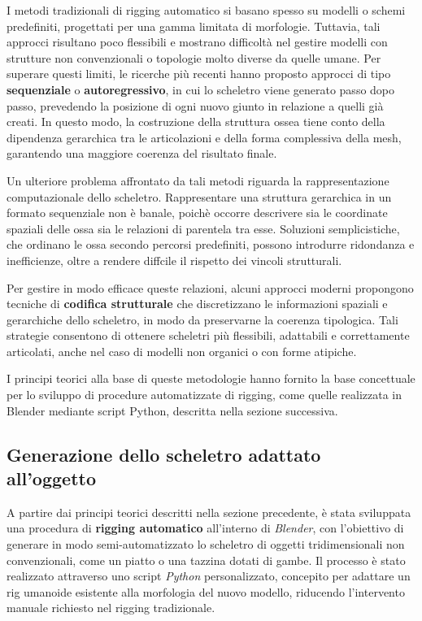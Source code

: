 I metodi tradizionali di rigging automatico si basano spesso su modelli o schemi predefiniti, progettati per una gamma limitata di morfologie. Tuttavia, tali approcci risultano poco flessibili e mostrano difficoltà nel gestire modelli con strutture non convenzionali o topologie molto diverse da quelle umane. Per superare questi limiti, le ricerche più recenti hanno proposto approcci di tipo \textbf{sequenziale} o \textbf{autoregressivo}, in cui lo scheletro viene generato passo dopo passo, prevedendo la posizione di ogni nuovo giunto in relazione a quelli già creati. In questo modo, la costruzione della struttura ossea tiene conto della dipendenza gerarchica tra le articolazioni e della forma complessiva della mesh, garantendo una maggiore coerenza del risultato finale.

Un ulteriore problema affrontato da tali metodi riguarda la rappresentazione computazionale dello scheletro. Rappresentare una struttura gerarchica in un formato sequenziale non è banale, poichè occorre descrivere sia le coordinate spaziali delle ossa sia le relazioni di parentela tra esse. Soluzioni semplicistiche, che ordinano le ossa secondo percorsi predefiniti, possono introdurre ridondanza e inefficienze, oltre a rendere diffcile il rispetto dei vincoli strutturali.

Per gestire in modo efficace queste relazioni, alcuni approcci moderni propongono tecniche di \textbf{codifica strutturale} che discretizzano le informazioni spaziali e gerarchiche dello scheletro, in modo da preservarne la coerenza tipologica. Tali strategie consentono di ottenere scheletri più flessibili, adattabili e correttamente articolati, anche nel caso di modelli non organici o con forme atipiche.

I principi teorici alla base di queste metodologie hanno fornito la base concettuale per lo sviluppo di procedure automatizzate di rigging, come quelle realizzata in Blender mediante script Python, descritta nella sezione successiva.


\subsection{Generazione dello scheletro adattato all'oggetto}

A partire dai principi teorici descritti nella sezione precedente, è stata sviluppata una procedura di \textbf{rigging automatico} all'interno di \textit{Blender}, con l'obiettivo di generare in modo semi-automatizzato lo scheletro di oggetti tridimensionali non convenzionali, come un piatto o una tazzina dotati di gambe. Il processo è stato realizzato attraverso uno script \textit{Python} personalizzato, concepito per adattare un rig umanoide esistente alla morfologia del nuovo modello, riducendo l'intervento manuale richiesto nel rigging tradizionale.

